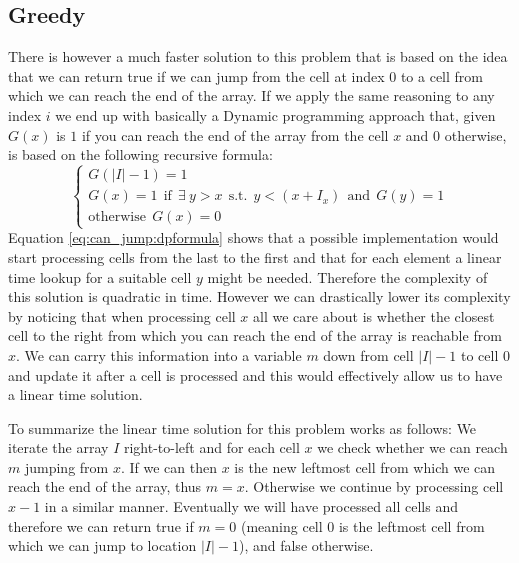 \subsection{Greedy}
\label{can_jump:sec:DP1}
There is however a much faster solution to this problem that is based on the idea that we can return
true if we can jump from the cell at index $0$ to a cell from which we can reach the end of the
array. If we apply the same reasoning to any index $i$ we end up with basically a Dynamic
programming approach that, given $G(x)$ is $1$ if you can reach the end of the array from the cell
$x$ and $0$ otherwise, is based on the following recursive formula:
\begin{equation}
	\begin{cases}
		G(|I|-1) = 1 \\
		G(x) = 1 \: \: \text{if} \: \: \exists \: y > x \:\: \text{s.t.} \:\: y < (x+I_x) \: \: \text{and} \: \:G(y) = 1\\
		\text{otherwise} \: \: G(x) = 0
	 \end{cases}
	\label{eq:can_jump:dpformula}
\end{equation}
Equation \ref{eq:can_jump:dpformula} shows that a possible implementation would start processing
cells from the last to the first and that for each element a linear time lookup for a suitable cell
$y$ might be needed. Therefore the complexity of this solution is quadratic in time. However we can
drastically lower its complexity by noticing that when processing cell $x$ all we care about is
whether the closest cell to the right from which you can reach the end of the array is reachable
from $x$. We can carry this information into a variable $m$ down from cell $|I|-1$ to cell $0$ and
update it after a cell is processed and this would effectively allow us to have a linear time
solution.

To summarize the linear time solution for this problem works as follows: We iterate the array $I$
right-to-left and for each cell $x$ we check whether we can reach $m$ jumping from $x$. If we can
then $x$ is the new leftmost cell from which we can reach the end of the array, thus $m = x$.
Otherwise we continue by processing cell $x-1$ in a similar manner. Eventually we will have
processed all cells and therefore we can return true if $m = 0$ (meaning cell $0$ is the leftmost
cell from which we can jump to location $|I|-1$), and false otherwise.



